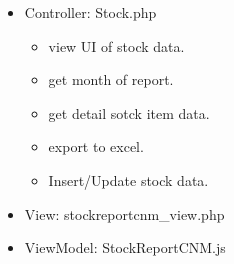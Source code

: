 \documentclass[letterpaper,10pt,english,openany,oneside]{sphinxmanual}
\begin{document}
\begin{sphinxVerbatim}[commandchars=\\\{\}]
             
  
             
\end{sphinxVerbatim}
\begin{itemize}
\item {} 
\sphinxAtStartPar
Controller: Stock.php
\begin{itemize}
\item {} 
\sphinxAtStartPar
{} view UI of stock data.

\item {} 
\sphinxAtStartPar
{} get month of report.

\item {} 
\sphinxAtStartPar
{} get detail sotck item data.

\item {} 
\sphinxAtStartPar
{} export to excel.

\item {} 
\sphinxAtStartPar
{} Insert/Update stock data.

\end{itemize}

\begin{sphinxVerbatim}[commandchars=\\\{\}]
   
 
\end{sphinxVerbatim}

\item {} 
\sphinxAtStartPar
View: stockreportcnm\_view.php

\item {} 
\sphinxAtStartPar
ViewModel: StockReportCNM.js

\end{itemize}
\end{document}

